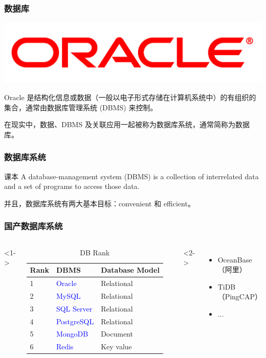 \documentclass[aspectratio=169, 14pt]{beamer}
\begin{document}
\begin{frame}
    \frametitle{数据库}
    \includegraphics[width=0.5\paperwidth]{image/oracle}
    \begin{exampleblock}{Oracle}
        是结构化信息或数据（一般以电子形式存储在计算机系统中）的有组织的集合，通常由数据库管理系统 (DBMS) 来控制。

        在现实中，数据、DBMS 及关联应用一起被称为\alert{数据库系统}，通常简称为数据库。 
    \end{exampleblock}
\end{frame}

\begin{frame}
    \frametitle{数据库系统}
    \begin{block}{课本}
        A database-management system (DBMS) is a collection of interrelated data and a set of programs to access those data.
    \end{block}
    并且，数据库系统有两大基本目标：\alert{convenient} 和 \alert{efficient}。
\end{frame}

\begin{frame}
    \frametitle{国产数据库系统}
    \begin{columns}
        <1->
        \begin{table}
            \caption{DB Rank}
            \begin{tabular}{lll}
              \toprule
              Rank & DBMS & Database Model \\
              \midrule
              1 & \textcolor{blue}{Oracle} & Relational \\
              2 & \textcolor{blue}{MySQL} & Relational \\
              3 & \textcolor{blue}{SQL Server} & Relational \\
              4 & \textcolor{blue}{PostgreSQL} & Relational \\
              5 & \textcolor{blue}{MongoDB} & Document \\
              6 & \textcolor{blue}{Redis} & Key value \\
              \bottomrule
            \end{tabular}
        \end{table}
        <2->
        \begin{itemize}
            \item OceanBase （阿里）
            \item TiDB （PingCAP）
            \item ...
        \end{itemize}
    \end{columns}

\end{frame}
\end{document}
